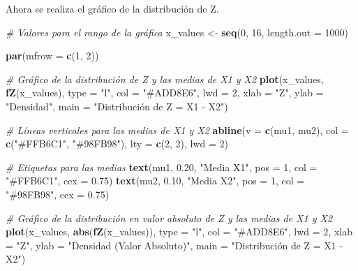 \documentclass[
]{article}
\newenvironment{Shaded}{\begin{snugshade}}{\end{snugshade}}
\newcommand{\AttributeTok}[1]{\textcolor[rgb]{0.13,0.29,0.53}{#1}}
\newcommand{\CommentTok}[1]{\textcolor[rgb]{0.56,0.35,0.01}{\textit{#1}}}
\newcommand{\DecValTok}[1]{\textcolor[rgb]{0.00,0.00,0.81}{#1}}
\newcommand{\FloatTok}[1]{\textcolor[rgb]{0.00,0.00,0.81}{#1}}
\newcommand{\FunctionTok}[1]{\textcolor[rgb]{0.13,0.29,0.53}{\textbf{#1}}}
\newcommand{\NormalTok}[1]{#1}
\newcommand{\OtherTok}[1]{\textcolor[rgb]{0.56,0.35,0.01}{#1}}
\newcommand{\StringTok}[1]{\textcolor[rgb]{0.31,0.60,0.02}{#1}}
\begin{document}
Ahora se realiza el gráfico de la distribución de Z.

\begin{Shaded}
\begin{Highlighting}[]
\CommentTok{\# Valores para el rango de la gráfica}
\NormalTok{x\_values }\OtherTok{\textless{}{-}} \FunctionTok{seq}\NormalTok{(}\DecValTok{0}\NormalTok{, }\DecValTok{16}\NormalTok{, }\AttributeTok{length.out =} \DecValTok{1000}\NormalTok{)}

\FunctionTok{par}\NormalTok{(}\AttributeTok{mfrow =} \FunctionTok{c}\NormalTok{(}\DecValTok{1}\NormalTok{, }\DecValTok{2}\NormalTok{))}

\CommentTok{\# Gráfico de la distribución de Z y las medias de X1 y X2}
\FunctionTok{plot}\NormalTok{(x\_values, }\FunctionTok{fZ}\NormalTok{(x\_values), }\AttributeTok{type =} \StringTok{"l"}\NormalTok{, }\AttributeTok{col =} \StringTok{"\#ADD8E6"}\NormalTok{, }\AttributeTok{lwd =} \DecValTok{2}\NormalTok{, }
     \AttributeTok{xlab =} \StringTok{"Z"}\NormalTok{, }\AttributeTok{ylab =} \StringTok{"Densidad"}\NormalTok{, }\AttributeTok{main =} \StringTok{"Distribución de Z = X1 {-} X2"}\NormalTok{)}

\CommentTok{\# Líneas verticales para las medias de X1 y X2}
\FunctionTok{abline}\NormalTok{(}\AttributeTok{v =} \FunctionTok{c}\NormalTok{(mu1, mu2), }\AttributeTok{col =} \FunctionTok{c}\NormalTok{(}\StringTok{"\#FFB6C1"}\NormalTok{, }\StringTok{"\#98FB98"}\NormalTok{), }\AttributeTok{lty =} \FunctionTok{c}\NormalTok{(}\DecValTok{2}\NormalTok{, }\DecValTok{2}\NormalTok{), }\AttributeTok{lwd =} \DecValTok{2}\NormalTok{)}

\CommentTok{\# Etiquetas para las medias}
\FunctionTok{text}\NormalTok{(mu1, }\FloatTok{0.20}\NormalTok{, }\StringTok{"Media X1"}\NormalTok{, }\AttributeTok{pos =} \DecValTok{1}\NormalTok{, }\AttributeTok{col =} \StringTok{"\#FFB6C1"}\NormalTok{, }\AttributeTok{cex =} \FloatTok{0.75}\NormalTok{)}
\FunctionTok{text}\NormalTok{(mu2, }\FloatTok{0.10}\NormalTok{, }\StringTok{"Media X2"}\NormalTok{, }\AttributeTok{pos =} \DecValTok{1}\NormalTok{, }\AttributeTok{col =} \StringTok{"\#98FB98"}\NormalTok{, }\AttributeTok{cex =} \FloatTok{0.75}\NormalTok{)}

\CommentTok{\# Gráfico de la distribución en valor absoluto de Z y las medias de X1 y X2}
\FunctionTok{plot}\NormalTok{(x\_values, }\FunctionTok{abs}\NormalTok{(}\FunctionTok{fZ}\NormalTok{(x\_values)), }\AttributeTok{type =} \StringTok{"l"}\NormalTok{, }\AttributeTok{col =} \StringTok{"\#ADD8E6"}\NormalTok{, }\AttributeTok{lwd =} \DecValTok{2}\NormalTok{, }\AttributeTok{xlab =} \StringTok{"Z"}\NormalTok{, }
     \AttributeTok{ylab =} \StringTok{"Densidad (Valor Absoluto)"}\NormalTok{, }\AttributeTok{main =} \StringTok{"Distribución de Z = X1 {-} X2"}\NormalTok{)}


\end{Highlighting}
\end{Shaded}
\end{document}
